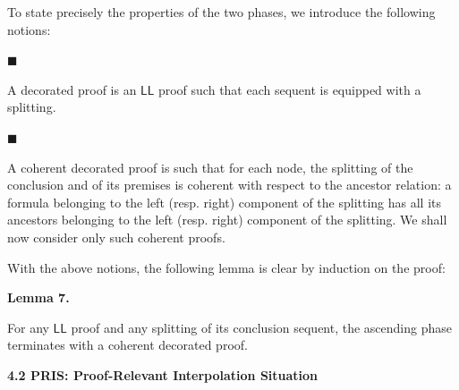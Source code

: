  
 
To state precisely the properties of the two phases, we introduce the following notions:\par
  
\par\noindent  $\blacksquare$ 
 
A decorated proof is an $\mathsf{LL}$ proof such that each sequent is equipped with a splitting.\par
 
 
 
\par\noindent  $\blacksquare$ 
 
A coherent decorated proof is such that for each node, the splitting of the conclusion and of its premises is coherent with respect to the ancestor relation: a formula belonging to the left (resp. right) component of the splitting has all its ancestors belonging to the left (resp. right) component of the splitting. We shall now consider only such coherent proofs.\par
 
 
  
 
 
With the above notions, the following lemma is clear by induction on the proof:\par
 
 
 
\par\medskip\noindent\textbf{Lemma 7.}\par
 
 
For any $\mathsf{LL}$ proof and any splitting of its conclusion sequent, the ascending phase terminates with a coherent decorated proof.\par
 
 
 
 
 
\par\medskip\noindent\textbf{4.2 PRIS: Proof-Relevant Interpolation Situation}\par
 
